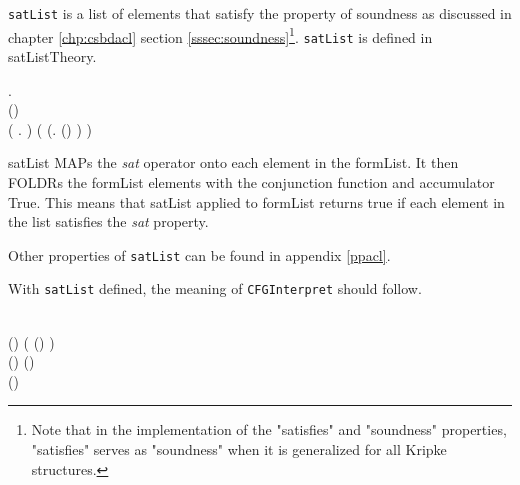 \documentclass[../../main/main.tex]{subfiles}
\begin{document}
\texttt{satList} is a list of elements that satisfy the property of soundness as discussed in chapter \ref{chp:csbdacl} section \ref{sssec:soundness}\footnote{Note that in the  implementation of the "satisfies" and "soundness" properties, "satisfies" serves as "soundness" when it is generalized for all Kripke structures.}.  \texttt{satList} is defined in satListTheory.  

\begin{tabbing}
\parskip=8pt
\HOLTokenTurnstile{} \hspace{0.3cm}\HOLSymConst{\HOLTokenForall{}}   .\\
\hspace{0.5cm}(\HOLSymConst{,}\HOLSymConst{,})   \HOLSymConst{\HOLTokenEquiv{}} \\
\hspace{0.5cm}  (\HOLTokenLambda{} .  \HOLSymConst{\HOLTokenConj{}} )  ( (\HOLTokenLambda{}. (\HOLSymConst{,}\HOLSymConst{,})  ) )
\parskip=18pt
\end{tabbing}

satList MAPs the \textit{sat} operator onto each element in the formList. It then FOLDRs the formList elements with the conjunction function and accumulator True.  This means that satList applied to formList returns true if each element in the list satisfies the \textit{sat} property.

Other properties of \texttt{satList} can be found in appendix \ref{ppacl}.

With \texttt{satList} defined, the meaning of \texttt{CFGInterpret} should follow.  

\begin{tabbing}
\parskip=8pt
\HOLTokenTurnstile{} \\
\hspace{0.5cm}(\HOLSymConst{,}\HOLSymConst{,})
     (    (\HOLSymConst{::}) 
     ) \HOLSymConst{\HOLTokenEquiv{}} \\
\hspace{0.5cm}(\HOLSymConst{,}\HOLSymConst{,})    \HOLSymConst{\HOLTokenConj{}} (\HOLSymConst{,}\HOLSymConst{,})   \HOLSymConst{\HOLTokenConj{}}\\
\hspace{0.5cm}(\HOLSymConst{,}\HOLSymConst{,})    
\parskip=18pt
\end{tabbing}
\end{document}
